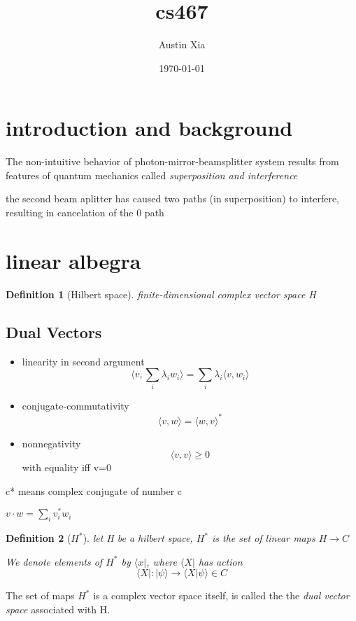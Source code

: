 \documentclass[10pt]{article}
\theoremstyle{break}
\newtheorem{defn}{Definition}[subsection]
\begin{document}
\let\ref\Cref

\title{\bf{cs467}}
\date{\today}
\author{Austin Xia}

\maketitle
\newpage
\tableofcontents
\listoffigures
\listoftables
\newpage
\section{introduction and background}
The non-intuitive behavior of photon-mirror-beamsplitter system
results from features of quantum mechanics called \emph{superposition and interference}

the second beam aplitter has caused two paths (in superposition) to interfere,
resulting in cancelation of the 0 path

\section{linear albegra}
\begin{defn}[Hilbert space]
    finite-dimensional complex vector space H
\end{defn}
\subsection{Dual Vectors}
\begin{itemize}
    \item linearity in second argument 
    $$\langle v, \sum_i\lambda_iw_i\rangle =
    \sum_i\lambda_i\langle v, w_i \rangle $$
    \item conjugate-commutativity
    $$\langle v, w\rangle = \langle w, v\rangle^*$$
    \item nonnegativity 
    $$\langle v,v\rangle \geq 0$$
    with equality iff v=0
\end{itemize}
c* means complex conjugate of number c

$v\cdot w =\sum_i v_i^*w_i$

\begin{defn}[$H^*$]
    let H be a hilbert space, $H^*$ is the set of linear maps $H\rightarrow C$

We denote elements of $H^*$ by $\langle x|$, where $\langle X |$ has action
    $$\langle X|:|\psi\rangle\rightarrow\langle X | \psi \rangle \in C$$
\end{defn}
The set of maps $H^*$ is a complex vector space itself, is called the 
the \emph{dual vector space} associated with H.
\end{document}
